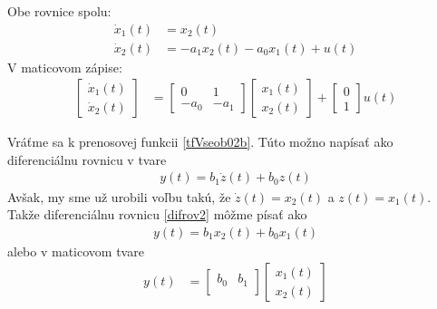 \documentclass[a4paper, 10pt, ]{article}
\begin{document}
\noindent
Obe rovnice spolu:
\begin{align}
    \dot x_1(t) &= x_2(t) \\
	\dot x_2(t) &=  - a_1 x_2(t) - a_0 x_1(t) + u(t)
\end{align}
V maticovom zápise:
\begin{align}
	\begin{bmatrix}
    	  \dot x_1(t) \\
		  \dot x_2(t)
 	\end{bmatrix}
	&=
	\begin{bmatrix}
    	0 & 1 \\
    	- a_0 & - a_1
  	\end{bmatrix}
    \begin{bmatrix}
    	  x_1(t) \\
		  x_2(t)
 	\end{bmatrix}
    +
    \begin{bmatrix}
    	  0 \\
		  1
 	\end{bmatrix}
    u(t)
\end{align}

Vráťme sa k prenosovej funkcii \eqref{tfVseob02b}. Túto možno napísať ako diferenciálnu rovnicu v tvare
\begin{align} \label{difrov2}
    y(t) = b_1 \dot z(t) + b_0 z(t)
\end{align}
Avšak, my sme už urobili voľbu takú, že $\dot z(t) = x_2(t)$ a $z(t)= x_1(t)$. Takže diferenciálnu rovnicu \eqref{difrov2} môžme písať ako
\begin{align}
    y(t) = b_1 x_2(t) + b_0 x_1(t)
\end{align}
alebo v maticovom tvare
\begin{align}
	y(t)
	&=
	\begin{bmatrix}
    	b_0 & b_1 \\
  	\end{bmatrix}
    \begin{bmatrix}
    	  x_1(t) \\
		  x_2(t)
 	\end{bmatrix}
\end{align}
\end{document}
